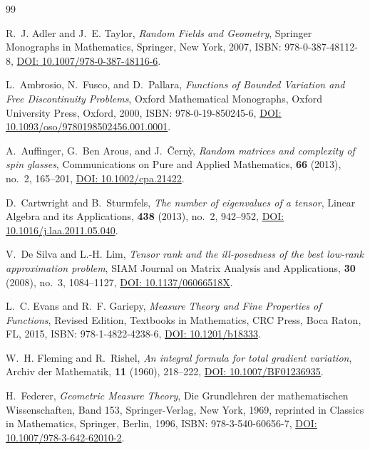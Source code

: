 \documentclass[11pt,a4paper,reqno]{amsart}
\theoremstyle{definition}
\numberwithin{equation}{section}
\begin{document}
\begin{thebibliography}{99}

R.~J. Adler and J.~E. Taylor,
\emph{Random Fields and Geometry},
Springer Monographs in Mathematics, Springer, New York, 2007,
ISBN: 978-0-387-48112-8,
\href{https://doi.org/10.1007/978-0-387-48116-6}{DOI: 10.1007/978-0-387-48116-6}.

L.~Ambrosio, N.~Fusco, and D.~Pallara,
\emph{Functions of Bounded Variation and Free Discontinuity Problems},
Oxford Mathematical Monographs, Oxford University Press, Oxford, 2000,
ISBN: 978-0-19-850245-6,
\href{https://doi.org/10.1093/oso/9780198502456.001.0001}{DOI: 10.1093/oso/9780198502456.001.0001}.

A.~Auffinger, G.~Ben Arous, and J.~{\v{C}}ern{\`y},
\emph{Random matrices and complexity of spin glasses},
Communications on Pure and Applied Mathematics, \textbf{66} (2013), no.~2, 165--201,
\href{https://doi.org/10.1002/cpa.21422}{DOI: 10.1002/cpa.21422}.

D.~Cartwright and B.~Sturmfels,
\emph{The number of eigenvalues of a tensor},
Linear Algebra and its Applications, \textbf{438} (2013), no.~2, 942--952,
\href{https://doi.org/10.1016/j.laa.2011.05.040}{DOI: 10.1016/j.laa.2011.05.040}.

V.~De Silva and L.-H. Lim,
\emph{Tensor rank and the ill-posedness of the best low-rank approximation problem},
SIAM Journal on Matrix Analysis and Applications, \textbf{30} (2008), no.~3, 1084--1127,
\href{https://doi.org/10.1137/06066518X}{DOI: 10.1137/06066518X}.

L.~C. Evans and R.~F. Gariepy,
\emph{Measure Theory and Fine Properties of Functions},
Revised Edition, Textbooks in Mathematics, CRC Press, Boca Raton, FL, 2015,
ISBN: 978-1-4822-4238-6,
\href{https://doi.org/10.1201/b18333}{DOI: 10.1201/b18333}.

W.~H. Fleming and R.~Rishel,
\emph{An integral formula for total gradient variation},
Archiv der Mathematik, \textbf{11} (1960), 218--222,
\href{https://doi.org/10.1007/BF01236935}{DOI: 10.1007/BF01236935}.

H.~Federer,
\emph{Geometric Measure Theory},
Die Grundlehren der mathematischen Wissenschaften, Band 153, Springer-Verlag, New York, 1969,
reprinted in Classics in Mathematics, Springer, Berlin, 1996,
ISBN: 978-3-540-60656-7,
\href{https://doi.org/10.1007/978-3-642-62010-2}{DOI: 10.1007/978-3-642-62010-2}.


\end{thebibliography}
\end{document}

